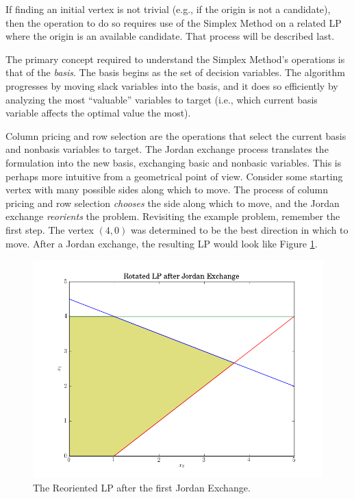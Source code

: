 If finding an initial vertex is not trivial (e.g., if the origin is not a
candidate), then the operation to do so requires use of the Simplex Method on a
related LP where the origin is an available candidate. That process will be
described last.

The primary concept required to understand the Simplex Method's operations is
that of the \textit{basis}. The basis begins as the set of decision
variables. The algorithm progresses by moving slack variables into the basis,
and it does so efficiently by analyzing the most ``valuable'' variables to
target (i.e., which current basis variable affects the optimal value the most).

Column pricing and row selection are the operations that select the current
basis and nonbasis variables to target. The Jordan exchange process translates
the formulation into the new basis, exchanging basic and nonbasic
variables. This is perhaps more intuitive from a geometrical point of
view. Consider some starting vertex with many possible sides along which to
move. The process of column pricing and row selection \textit{chooses} the side
along which to move, and the Jordan exchange \textit{reorients} the
problem. Revisiting the example problem, remember the first step. The vertex
$(4, 0)$ was determined to be the best direction in which to move. After a
Jordan exchange, the resulting LP would look like Figure \ref{fig:rotated}.

\begin{figure}[H]
  \begin{center}
    \includegraphics[width=\linewidth]{./chapters/litreview/plots/rotated.png}
  \caption{The Reoriented LP after the first Jordan Exchange.}
  \label{fig:rotated}
  \end{center}
\end{figure}

